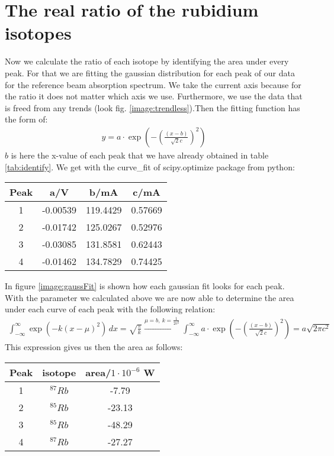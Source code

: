 \section{The real ratio of the rubidium isotopes}
\label{sec:ratio}
Now we calculate the ratio of each isotope by identifying the area under every peak. For that we are fitting the gaussian distribution for each peak of our data for the reference beam absorption spectrum. We take the current axis because for the ratio it does not matter which axis we use. Furthermore, we use the data that is freed from any trends (look fig. \ref{image:trendless}).Then the fitting function has the form of:
\begin{gather}
    y = a\cdot\exp(-\left(\frac{(x-b)}{\sqrt{2}c}\right)^2)
    \label{eq:gaussFit}
\end{gather}
$b$ is here the x-value of each peak that we have already obtained in table \ref{tab:identify}. We get with the curve_fit of scipy.optimize package from python:
\begin{center}
    \begin{tabular}{c | c c c}
        Peak & a/V & b/mA & c/mA\\
        \hline
        1 &  -0.00539 & 119.4429 & 0.57669\\
        2 &  -0.01742 & 125.0267 & 0.52976\\
        3 &  -0.03085 & 131.8581 & 0.62443\\
        4 &  -0.01462 & 134.7829 & 0.74425\\
    \end{tabular}
\end{center}
In figure \ref{image:gaussFit} is shown how each gaussian fit looks for each peak.\\
With the parameter we calculated above we are now able to determine the area under each curve of each peak with the following relation:
\begin{gather}
    \int^{\infty}_{-\infty}\exp(-k(x-\mu)^2)\,dx = \sqrt{\frac{\pi}{k}} \xrightarrow{\mu = b,~k = \frac{1}{2c^2}}\int^{\infty}_{-\infty}a\cdot\exp(-\left(\frac{(x-b)}{\sqrt{2}c}\right)^2) = a \sqrt{2\pi c^2}
\end{gather}
This expression gives us then the area as follows:
\begin{center}
    \begin{tabular}{c | c | c}
        Peak & isotope & area/$1\cdot 10^{-6}$ W\\
        \hline
        1 & $^{87}Rb$ &  -7.79 \\
        2 & $^{85}Rb$ & -23.13 \\
        3 & $^{85}Rb$ & -48.29 \\
        4 & $^{87}Rb$ & -27.27 \\
    \end{tabular}
\end{center}
